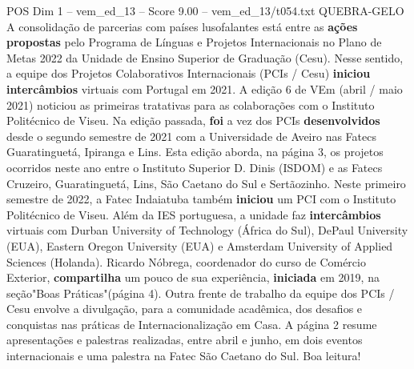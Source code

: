 \begin{textsample}{POS Dim 1 – vem\_ed\_13 – Score 9.00 – vem\_ed\_13/t054.txt}  \label{ex:f1_pos_125}
QUEBRA-GELO A consolidação de parcerias com países lusofalantes está entre as \textbf{ações} \textbf{propostas} pelo Programa de Línguas e Projetos Internacionais no Plano de Metas 2022 da Unidade de Ensino Superior de Graduação (Cesu).
Nesse sentido, a equipe dos Projetos Colaborativos Internacionais (PCIs / Cesu) \textbf{iniciou} \textbf{intercâmbios} virtuais com Portugal em 2021.
A edição 6 de VEm (abril / maio 2021) noticiou as primeiras tratativas para as colaborações com o Instituto Politécnico de Viseu.
Na edição passada, \textbf{foi} a vez dos PCIs \textbf{desenvolvidos} desde o segundo semestre de 2021 com a Universidade de Aveiro nas Fatecs Guaratinguetá, Ipiranga e Lins.
Esta edição aborda, na página 3, os projetos ocorridos neste ano entre o Instituto Superior D.
Dinis (ISDOM) e as Fatecs Cruzeiro, Guaratinguetá, Lins, São Caetano do Sul e Sertãozinho.
Neste primeiro semestre de 2022, a Fatec Indaiatuba também \textbf{iniciou} um PCI com o Instituto Politécnico de Viseu.
Além da IES portuguesa, a unidade faz \textbf{intercâmbios} virtuais com Durban University of Technology (África do Sul), DePaul University (EUA), Eastern Oregon University (EUA) e Amsterdam University of Applied Sciences (Holanda).
Ricardo Nóbrega, coordenador do curso de Comércio Exterior, \textbf{compartilha} um pouco de sua experiência, \textbf{iniciada} em 2019, na seção"Boas Práticas"(página 4).
Outra frente de trabalho da equipe dos PCIs / Cesu envolve a divulgação, para a comunidade acadêmica, dos desafios e conquistas nas práticas de Internacionalização em Casa.
A página 2 resume apresentações e palestras realizadas, entre abril e junho, em dois eventos internacionais e uma palestra na Fatec São Caetano do Sul.
Boa leitura!

\end{textsample}
